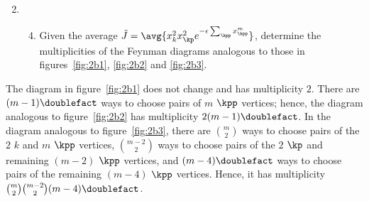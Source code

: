 \begin{enumerate}[leftmargin=0cm]
  \setcounter{enumi}{1}
  \item
        \begin{enumerate}
          \setcounter{enumii}{3}
          \item \label{2d}
                Given the average $\tilde{J} = \avg{x_k^2 x_\kp^2 e^{- \epsilon \sum_\kpp
                        x_\kpp^m }}$, determine the multiplicities of the Feynman diagrams analogous to
                those in figures~\ref{fig:2b1}, \ref{fig:2b2} and \ref{fig:2b3}.
        \end{enumerate}
\end{enumerate}

The diagram in figure~\ref{fig:2b1} does not change and has multiplicity $2$.
There are $(m - 1)\doublefact$ ways to choose pairs of $m$ $\kpp$ vertices;
hence, the diagram analogous to figure~\ref{fig:2b2} has multiplicity $2 (m -
  1)\doublefact$.
In the diagram analogous to figure~\ref{fig:2b3}, there are $\binom{m}{2}$ ways
to choose pairs of the $2$ $k$ and $m$ $\kpp$ vertices, $\binom{m - 2}{2}$ ways
to choose pairs of the $2$ $\kp$ and remaining $(m - 2)$ $\kpp$ vertices, and
$(m - 4)\doublefact$ ways to choose pairs of the remaining $(m - 4)$ $\kpp$
vertices.
Hence, it has multiplicity $\binom{m}{2} \binom{m - 2}{2} (m - 4)\doublefact$.
